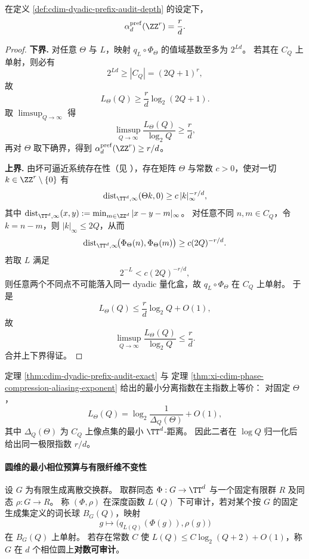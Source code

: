 \begin{theorem}[相位审计指数的精确值]\label{thm:cdim-dyadic-prefix-audit-exact}
在定义 \ref{def:cdim-dyadic-prefix-audit-depth} 的设定下，
\[
\alpha_{d}^{\mathrm{pref}}(\ZZ^r)=\frac{r}{d}.
\]
\end{theorem}
\begin{proof}
\textbf{下界.}
对任意 \(\Theta\) 与 \(L\)，映射 \(q_L\circ\Phi_{\Theta}\) 的值域基数至多为 \(2^{Ld}\)。
若其在 \(C_Q\) 上单射，则必有
\[
2^{Ld}\ge |C_Q|=(2Q+1)^r,
\]
故
\[
L_{\Theta}(Q)\ge \frac{r}{d}\log_2(2Q+1).
\]
取 \(\limsup_{Q\to\infty}\) 得
\[
\limsup_{Q\to\infty}\frac{L_{\Theta}(Q)}{\log_2 Q}\ge \frac{r}{d},
\]
再对 \(\Theta\) 取下确界，得到
\(
\alpha_{d}^{\mathrm{pref}}(\ZZ^r)\ge r/d
\)。
\par
\textbf{上界.}
由坏可逼近系统存在性（见 \cite{Schmidt1969BadlyApproximableSystems}），存在矩阵 \(\Theta\) 与常数 \(c>0\)，使对一切 \(k\in\ZZ^r\setminus\{0\}\) 有
\[
\operatorname{dist}_{\TT^d,\infty}(\Theta k,0)\ge c\,|k|_{\infty}^{-r/d},
\]
其中
\(
\operatorname{dist}_{\TT^d,\infty}(x,y):=\min_{m\in\ZZ^d}|x-y-m|_{\infty}
\)。
对任意不同 \(n,m\in C_Q\)，令 \(k=n-m\)，则 \(|k|_{\infty}\le 2Q\)，从而
\[
\operatorname{dist}_{\TT^d,\infty}\!\bigl(\Phi_{\Theta}(n),\Phi_{\Theta}(m)\bigr)
\ge c(2Q)^{-r/d}.
\]
若取 \(L\) 满足
\[
2^{-L}<c(2Q)^{-r/d},
\]
则任意两个不同点不可能落入同一 dyadic 量化盒，故 \(q_L\circ\Phi_{\Theta}\) 在 \(C_Q\) 上单射。
于是
\[
L_{\Theta}(Q)\le \frac{r}{d}\log_2 Q+O(1),
\]
故
\[
\limsup_{Q\to\infty}\frac{L_{\Theta}(Q)}{\log_2 Q}\le \frac{r}{d}.
\]
合并上下界得证。
\end{proof}

\begin{remark}[与最小分离指数口径的一致性]\label{rem:cdim-dyadic-prefix-vs-separation}
定理 \ref{thm:cdim-dyadic-prefix-audit-exact} 与
定理 \ref{thm:xi-cdim-phase-compression-aliasing-exponent}
给出的最小分离指数在主指数上等价：
对固定 \(\Theta\)，
\[
L_{\Theta}(Q)=\log_2\!\frac{1}{\Delta_Q(\Theta)}+O(1),
\]
其中 \(\Delta_Q(\Theta)\) 为 \(C_Q\) 上像点集的最小 \(\TT^d\)-距离。
因此二者在 \(\log Q\) 归一化后给出同一极限指数 \(r/d\)。
\end{remark}



\paragraph{圆维的最小相位预算与有限纤维不变性}
\begin{definition}[带固定有限外置寄存器的对数可审计]\label{def:cdim-log-auditable-with-finite-register}
设 \(G\) 为有限生成离散交换群。
取群同态
\(
\Phi:G\to\TT^d
\)
与一个固定有限群 \(R\) 及同态
\(
\rho:G\to R
\)。
称 \((\Phi,\rho)\) 在深度函数 \(L(Q)\) 下可审计，若对某个按 \(G\) 的固定生成集定义的词长球 \(B_G(Q)\)，映射
\[
g\longmapsto \bigl(q_{L(Q)}(\Phi(g)),\rho(g)\bigr)
\]
在 \(B_G(Q)\) 上单射。
若存在常数 \(C\) 使 \(L(Q)\le C\log_2(Q+2)+O(1)\)，称 \(G\) 在 \(d\) 个相位圆上\textbf{对数可审计}。
\end{definition}

